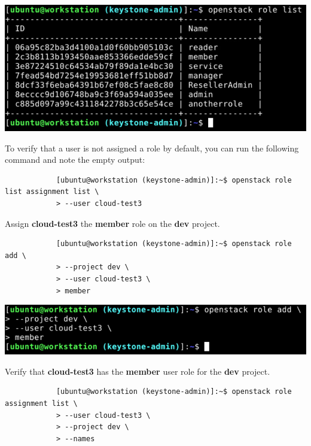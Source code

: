 \documentclass[letterpaper, 12pt]{article}
\begin{document}
\begin{enumerate}
\begin{labstep}
        \begin{center}
            \includegraphics[width=\linewidth]{images/part4/step8.png}
        \end{center}
    \end{labstep}

    \begin{tipbox}
        To verify that a user is not assigned a role by default, you can run the following command and note the empty output:
        \begin{lstlisting}
            [ubuntu@workstation (keystone-admin)]:~$ openstack role list assignment list \
            > --user cloud-test3
        \end{lstlisting}
    \end{tipbox}

    \begin{labstep}
        Assign \textbf{cloud-test3} the \textbf{member} role on the \textbf{dev} project.
        \begin{lstlisting}
            [ubuntu@workstation (keystone-admin)]:~$ openstack role add \
            > --project dev \
            > --user cloud-test3 \
            > member
        \end{lstlisting}

        \begin{center}
            \includegraphics[width=\linewidth]{images/part4/step9.png}
        \end{center}
    \end{labstep}

    \begin{labstep}
        Verify that \textbf{cloud-test3} has the \textbf{member} user role for the \textbf{dev} project.
        \begin{lstlisting}
            [ubuntu@workstation (keystone-admin)]:~$ openstack role assignment list \
            > --user cloud-test3 \
            > --project dev \
            > --names
        \end{lstlisting}


\end{labstep}
\end{enumerate}
\end{document}
